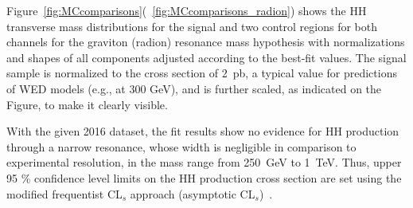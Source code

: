 Figure~\ref{fig:MCcomparisons}(~\ref{fig:MCcomparisons_radion}) shows the HH transverse mass distributions
for the signal and two control regions for both channels for the graviton (radion) resonance mass hypothesis with normalizations and shapes of all
components adjusted according to the best-fit values. The signal
sample is normalized to the cross section of 2~pb, a typical value for
predictions of WED models (e.g., at 300 GeV), and is further scaled, as indicated on the
Figure, to make it clearly visible. %




With the given 2016 dataset, the fit results show no evidence for HH production through a narrow
resonance, whose width is negligible in comparison to experimental
resolution, in the mass range from 250~GeV to 1~TeV. Thus, upper 95 \% confidence level limits on the
HH production cross section are set using the modified
frequentist CL$_s$ approach (asymptotic CL$_s$)~\cite{Junk:1999kv,LEP-CLs, HIG-11-011, Cowan:2010js}.

